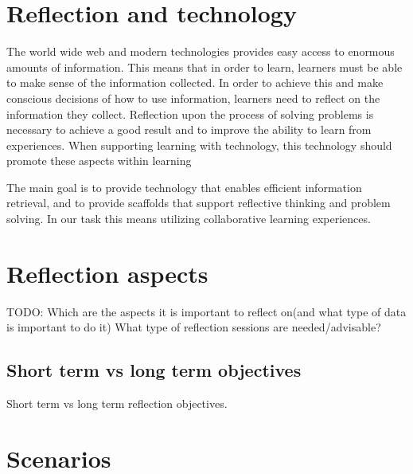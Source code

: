 \section{Reflection and technology}
The world wide web and modern technologies provides easy access to enormous amounts of information. This means that in order to learn, learners must be able to make sense of the information collected.  
In order to achieve this and make conscious decisions of how to use information, learners need to reflect on the information they collect. Reflection upon the process of solving problems is necessary to achieve a good result and to improve the ability to learn from experiences. When supporting learning with technology, this technology should promote these aspects within learning\cite{Lin1999}

The main goal is to provide technology that enables efficient information retrieval, and to provide scaffolds that support reflective thinking and problem solving. In our task this means utilizing collaborative learning experiences. 

\section{Reflection aspects}
TODO:
Which are the aspects it is important to reflect on(and what type of data is important to do it)
What type of reflection sessions are needed/advisable?
\subsection{Short term vs long term objectives}
Short term vs long term reflection objectives. 

\section{Scenarios}
\label{problemdefinition}

